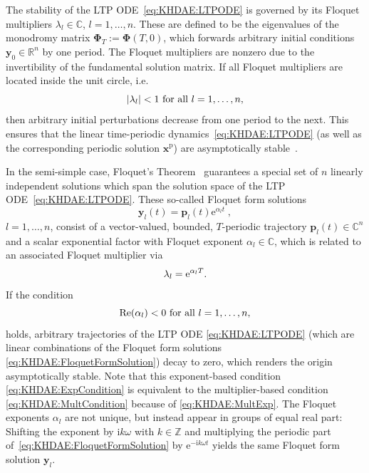 \documentclass[a4paper, nonatbib, 3p, twocolumn]{elsarticle}
\theoremstyle{plain}
\theoremstyle{definition}
\theoremstyle{remark}
\newcommand{\mo}{\vPh_T}
\newcommand{\ic}{\ri} %
\newcommand{\ex}{\re} %
\newcommand{\Rspace}{\mathbb{R}}
\newcommand{\Cspace}{\mathbb{C}}
\newcommand{\Zspace}{\mathbb{Z}}
\newcommand{\re}{\mathrm e}
\newcommand{\ri}{\mathrm i}
\newcommand{\rp}{\mathrm p}
\newcommand{\vPh}{\mathbf \Phi}
\newcommand{\vp}{\mathbf p}
\newcommand{\vx}{\mathbf x}
\newcommand{\vy}{\mathbf y}
\begin{document}
The stability of the LTP ODE~\eqref{eq:KHDAE:LTPODE} is governed by its Floquet multipliers $\lambda_l\in\Cspace$, $l = 1, \dots, n$.
These are defined to be the eigenvalues of the monodromy matrix $\mo:=\vPh(T, 0)$, which forwards arbitrary initial conditions $\vy_0\in\Rspace^n$ by one period. The Floquet multipliers are nonzero due to the invertibility of the fundamental solution matrix.
If all Floquet multipliers are located inside the unit circle, i.e. 
\begin{equation}\label{eq:KHDAE:MultCondition}
\vert\lambda_l\vert < 1 \textnormal{ for all } l = 1, \dots, n, 
\end{equation} 
then arbitrary initial perturbations decrease from one period to the next. This ensures that the linear time-periodic dynamics~\eqref{eq:KHDAE:LTPODE} (as well as the corresponding periodic solution $\vx^\rp$) are asymptotically stable~\cite{Teschl2012}.

In the semi-simple case, Floquet's Theorem~\cite{Teschl2012} guarantees a special set of $n$ linearly independent solutions which span the solution space of the LTP ODE~\eqref{eq:KHDAE:LTPODE}.
These so-called Floquet form solutions
\begin{equation}\label{eq:KHDAE:FloquetFormSolution}
    \vy_l(t)=\vp_l(t)\ex^{\alpha_l t}\;,
\end{equation}
$l = 1, \dots, n$, consist of a vector-valued, bounded, $T$-periodic trajectory $\vp_l(t) \in \Cspace^n$ and a scalar exponential factor with Floquet exponent $\alpha_l \in \Cspace$, which is related to an associated Floquet multiplier via
\begin{equation}\label{eq:KHDAE:MultExp}
    \lambda_l = \ex^{\alpha_lT}\textnormal{.}
\end{equation}
If the condition
\begin{equation}\label{eq:KHDAE:ExpCondition}
\mathrm{Re}(\alpha_l) < 0 \textnormal{ for all } l = 1, \dots, n, 
\end{equation}
holds, arbitrary trajectories of the LTP ODE \eqref{eq:KHDAE:LTPODE} (which are linear combinations of the Floquet form solutions \eqref{eq:KHDAE:FloquetFormSolution}) decay to zero, which renders the origin asymptotically stable.
Note that this exponent-based condition \eqref{eq:KHDAE:ExpCondition} is equivalent to the multiplier-based condition \eqref{eq:KHDAE:MultCondition} because of \eqref{eq:KHDAE:MultExp}. The Floquet exponents $\alpha_l$ are not unique, but instead appear in groups of equal real part: Shifting the exponent by $\ic k \omega$ with $k \in \Zspace$ and multiplying the periodic part of~\eqref{eq:KHDAE:FloquetFormSolution} by $\ex^{-\ic k \omega t}$ yields the same Floquet form solution $\vy_l$.
\end{document}
